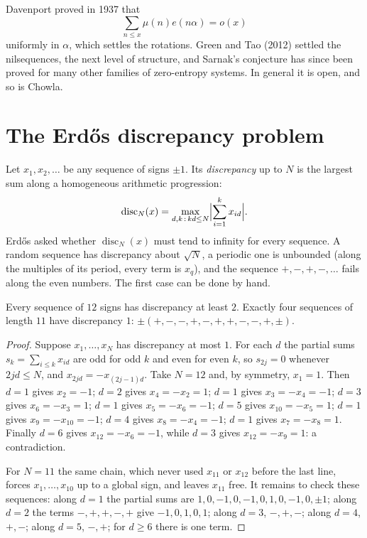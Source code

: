 \begin{remark}\label{conjectures:rem:sarnakknown}
Davenport proved in 1937 that
\[
\sum_{n\le x}\mu(n)e(n\alpha)=o(x)
\]
uniformly in $\alpha$, which settles the rotations. Green and Tao (2012) settled the
nilsequences, the next level of structure, and Sarnak's conjecture has since been proved for many other families of zero-entropy systems. In general it is open,
and so is Chowla.
\end{remark}

\section{The Erd\H os discrepancy problem}

Let $x_1,x_2,\dots$ be any sequence of signs $\pm1$. Its \emph{discrepancy} up to $N$ is the largest sum along a homogeneous arithmetic progression:
\[
\operatorname{disc}_N(x)=\max_{d,k\,:\,kd\le N}\Bigl|\sum_{i=1}^kx_{id}\Bigr|.
\]
Erd\H os asked whether $\operatorname{disc}_N(x)$ must tend to infinity for every sequence. A random sequence has discrepancy about $\sqrt N$, a periodic one
is unbounded (along the multiples of its period, every term is $x_q$), and the sequence $+,-,+,-,\dots$ fails along the even numbers. The first case can be
done by hand.

\begin{theorem}\label{conjectures:thm:edp11}
Every sequence of $12$ signs has discrepancy at least $2$. Exactly four sequences of length $11$ have discrepancy $1$: $\pm(+,-,-,+,-,+,+,-,-,+,\pm)$.
\end{theorem}
\begin{proof}
Suppose $x_1,\dots,x_N$ has discrepancy at most $1$. For each $d$ the partial sums $s_k=\sum_{i\le k}x_{id}$ are odd for odd $k$ and even for even $k$, so
$s_{2j}=0$ whenever $2jd\le N$, and $x_{2jd}=-x_{(2j-1)d}$. Take $N=12$ and, by symmetry, $x_1=1$. Then $d=1$ gives $x_2=-1$; $d=2$ gives $x_4=-x_2=1$; $d=1$ gives
$x_3=-x_4=-1$; $d=3$ gives $x_6=-x_3=1$; $d=1$ gives $x_5=-x_6=-1$; $d=5$ gives $x_{10}=-x_5=1$; $d=1$ gives $x_9=-x_{10}=-1$; $d=4$ gives $x_8=-x_4=-1$; $d=1$ gives
$x_7=-x_8=1$. Finally $d=6$ gives $x_{12}=-x_6=-1$, while $d=3$ gives $x_{12}=-x_9=1$: a contradiction.

For $N=11$ the same chain, which never used $x_{11}$ or $x_{12}$ before the last line, forces $x_1,\dots,x_{10}$ up to a global sign, and leaves $x_{11}$ free.
It remains to check these sequences: along $d=1$ the partial sums are $1,0,-1,0,-1,0,1,0,-1,0,\pm1$; along $d=2$ the terms $-,+,+,-,+$ give $-1,0,1,0,1$;
along $d=3$, $-,+,-$; along $d=4$, $+,-$; along $d=5$, $-,+$; for $d\ge6$ there is one term.
\end{proof}

